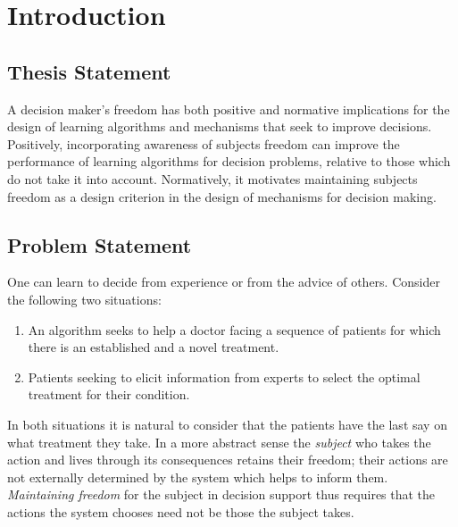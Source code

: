 \chapter{Introduction}
\label{cha:intro}



\section{Thesis Statement}
\label{sec:thesisstatement}

A decision maker's freedom has both positive and normative implications for the design of learning algorithms and mechanisms that seek to improve decisions.
Positively, incorporating awareness of subjects freedom can improve the performance of learning algorithms for decision problems, relative to those which do not take it into account.
Normatively, it motivates maintaining subjects freedom as a design criterion in the design of mechanisms for decision making.

\section{Problem Statement}
\label{sec:problemstatement}

One can learn to decide from experience or from the advice of others. Consider the following two situations:

\begin{enumerate}
	\item An algorithm seeks to help a doctor facing a sequence of patients for which there is an established and a novel treatment.
	\item Patients seeking to elicit information from experts to select the optimal treatment for their condition.
\end{enumerate}

In both situations it is natural to consider that the patients have the last say on what treatment they take.
In a more abstract sense the \emph{subject} who takes the action and lives through its consequences retains their freedom; their actions are not externally determined by the system which helps to inform them.
\emph{Maintaining freedom} for the subject in decision support thus requires that the actions the system chooses need not be those the subject takes.

